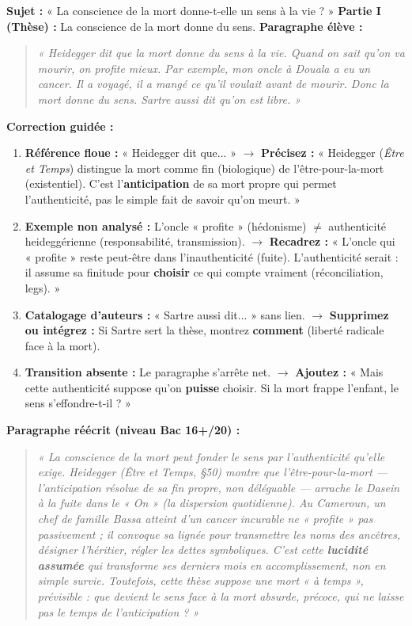 \documentclass[11pt]{article}
\newcommand{\cle}[1]{{\popxbold\color{popdark}#1}}
\begin{document}
\begin{exoresolu}
\textbf{Sujet :} « La conscience de la mort donne-t-elle un sens à la vie ? »
\textbf{Partie I (Thèse) :} La conscience de la mort donne du sens.
\textbf{Paragraphe élève :}
\begin{quote}
\emph{« Heidegger dit que la mort donne du sens à la vie. Quand on sait qu'on va mourir, on profite mieux. Par exemple, mon oncle à Douala a eu un cancer. Il a voyagé, il a mangé ce qu'il voulait avant de mourir. Donc la mort donne du sens. Sartre aussi dit qu'on est libre. »}
\end{quote}
\textbf{Correction guidée :}
\begin{enumerate}
    \item \textbf{Référence floue :} « Heidegger dit que... » $\rightarrow$ \textbf{Précisez :} « Heidegger (\emph{Être et Temps}) distingue la \cle{mort comme fin} (biologique) de l'\cle{être-pour-la-mort} (existentiel). C'est l'\textbf{anticipation} de sa mort propre qui permet l'authenticité, pas le simple fait de savoir qu'on meurt. »
    \item \textbf{Exemple non analysé :} L'oncle « profite » (hédonisme) $\neq$ authenticité heideggérienne (responsabilité, transmission). $\rightarrow$ \textbf{Recadrez :} « L'oncle qui « profite » reste peut-être dans l'inauthenticité (fuite). L'authenticité serait : il assume sa finitude pour \textbf{choisir} ce qui compte vraiment (réconciliation, legs). »
    \item \textbf{Catalogage d'auteurs :} « Sartre aussi dit... » sans lien. $\rightarrow$ \textbf{Supprimez ou intégrez :} Si Sartre sert la thèse, montrez \textbf{comment} (liberté radicale face à la mort).
    \item \textbf{Transition absente :} Le paragraphe s'arrête net. $\rightarrow$ \textbf{Ajoutez :} « Mais cette authenticité suppose qu'on \textbf{puisse} choisir. Si la mort frappe l'enfant, le sens s'effondre-t-il ? »
\end{enumerate}
\textbf{Paragraphe réécrit (niveau Bac 16+/20) :}
\begin{quote}
\emph{« La conscience de la mort peut fonder le sens par l'authenticité qu'elle exige. Heidegger (\emph{Être et Temps}, §50) montre que l'\cle{être-pour-la-mort} — l'anticipation résolue de sa fin propre, non déléguable — arrache le \emph{Dasein} à la fuite dans le « On » (la dispersion quotidienne). Au Cameroun, un chef de famille Bassa atteint d'un cancer incurable ne « profite » pas passivement ; il convoque sa lignée pour transmettre les noms des ancêtres, désigner l'héritier, régler les dettes symboliques. C'est cette \textbf{lucidité assumée} qui transforme ses derniers mois en \emph{accomplissement}, non en simple survie. Toutefois, cette thèse suppose une mort « à temps », prévisible : que devient le sens face à la mort absurde, précoce, qui ne laisse pas le temps de l'anticipation ? »}
\end{quote}
\end{exoresolu}
\end{document}
